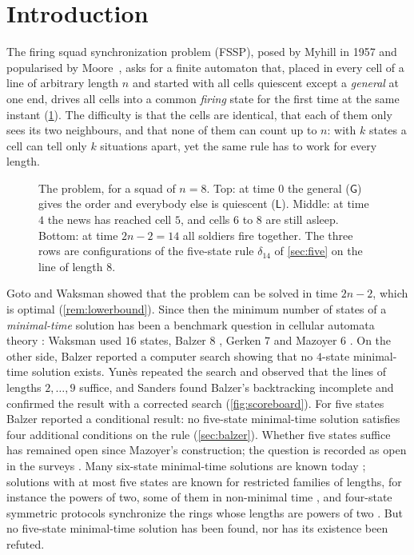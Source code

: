 \section{Introduction}\label{sec:intro}

The firing squad synchronization problem (FSSP), posed by Myhill in 1957
and popularised by Moore~\cite{Moore64}, asks for a finite automaton that,
placed in every cell of a line of arbitrary length $n$ and started with all
cells quiescent except a \emph{general} at one end, drives all cells into a
common \emph{firing} state for the first time at the same instant
(\cref{fig:squad}). The difficulty is that the cells are identical, that
each of them only sees its two neighbours, and that none of them can count
up to $n$: with $k$ states a cell can tell only $k$ situations apart, yet
the same rule has to work for every length.

\begin{figure}[b]
\centering

\caption{The problem, for a squad of $n=8$. Top: at time $0$ the general
($\mathsf G$) gives the order and everybody else is quiescent
($\mathsf L$). Middle: at time $4$ the news has reached cell $5$, and cells
$6$ to $8$ are still asleep. Bottom: at time $2n-2=14$ all soldiers fire
together. The three rows are configurations of the five-state rule
$\delta_{14}$ of \cref{sec:five} on the line of length $8$.}
\label{fig:squad}
\end{figure}

Goto \cite{Goto62} and Waksman \cite{Waksman66} showed that the problem can
be solved in time $2n-2$, which is optimal (\cref{rem:lowerbound}). Since then the
minimum number of states of a \emph{minimal-time} solution has been a
benchmark question in cellular automata theory \cite{Mazoyer86,Umeo09}:
Waksman used $16$ states, Balzer $8$ \cite{Balzer67}, Gerken $7$
\cite{Gerken87} and Mazoyer $6$ \cite{Mazoyer87}. On the other side, Balzer
\cite{Balzer67} reported a computer search showing that no $4$-state
minimal-time solution exists. Yun\`es \cite{Yunes93} repeated the search and
observed that the lines of lengths $2,\dots,9$ suffice, and Sanders
\cite{Sanders94} found Balzer's backtracking incomplete and confirmed the
result with a corrected search (\cref{fig:scoreboard}). For five states
Balzer reported a conditional result: no five-state minimal-time solution
satisfies four additional conditions on the rule (\cref{sec:balzer}).
Whether five states suffice has remained open since
Mazoyer's construction; the question is recorded as open in the surveys
\cite{Umeo09,Correa17}. Many six-state minimal-time solutions are known
today \cite{Clergue18,NguyenMaignan20}; solutions with at most five states
are known for restricted families of lengths, for instance the powers of
two, some of them in non-minimal time \cite{UmeoYanagihara07,Yunes08}, and
four-state symmetric protocols synchronize the rings whose lengths are
powers of two \cite{UmeoKamikawaYunes09}. But no five-state minimal-time
solution has been found, nor has its existence been refuted.

